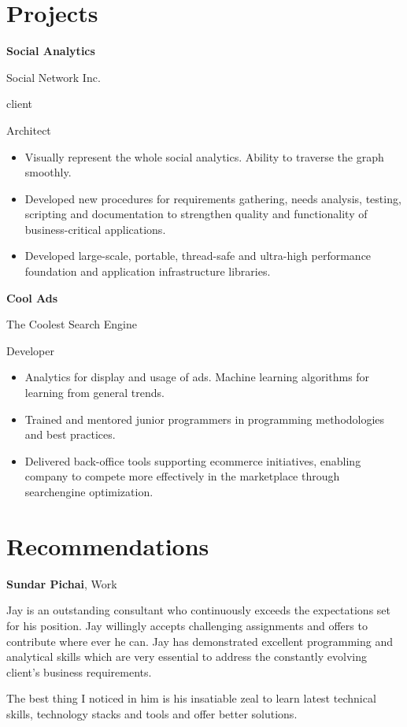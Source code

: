 \documentclass[11pt]{article}
\begin{document}
\section*{Projects}
%
\begin{leftrulebox}[1/2009 -- 1/2010]
	\textbf{Social Analytics} \par
	Social Network Inc. \par
	client \par
	Architect \par
	\begin{itemize}
		\item Visually represent the whole social analytics. Ability to traverse the graph smoothly.
		\item Developed new procedures for requirements gathering, needs analysis, testing, scripting and
                documentation to strengthen quality and functionality of business-critical applications.
		\item Developed large-scale, portable, thread-safe and ultra-high performance foundation and application
                infrastructure libraries.
	\end{itemize}
\end{leftrulebox}
%
\begin{leftrulebox}[1/2012 -- 1/2013]
	\textbf{Cool Ads}\par
	The Coolest Search Engine \par
	Developer \par
	\begin{itemize}
		\item Analytics for display and usage of ads. Machine learning algorithms for learning from general
                trends.
		\item Trained and mentored junior programmers in programming methodologies and best practices.
		\item Delivered back-office tools supporting ecommerce initiatives, enabling company to compete more
                effectively in the marketplace through searchengine optimization.
	\end{itemize}
\end{leftrulebox}
%
\section*{Recommendations}
%
\begin{leftrulebox}[1]
	\textbf{Sundar Pichai}, Work \par
	Jay is an outstanding consultant who continuously exceeds the expectations set for his position. Jay willingly
    accepts challenging assignments and offers to contribute where ever he can. Jay has demonstrated excellent
    programming and analytical skills which are very essential to address the constantly evolving client's
    business requirements.
	
	The best thing I noticed in him is his insatiable zeal to learn latest technical skills, technology stacks
    and tools and offer better solutions.
\end{leftrulebox}
%
\end{document}
